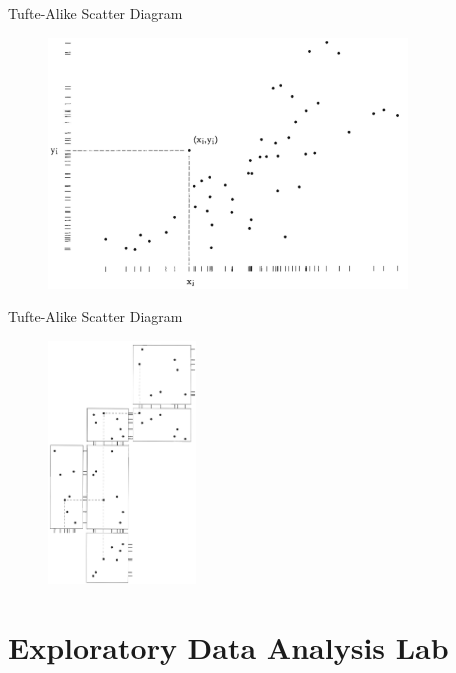 \documentclass[notes, aspectratio=1610]{beamer}
\begin{document}
\begin{frame}{Tufte-Alike Scatter Diagram}{}
\begin{figure}
		\begin{center}
			\includegraphics[width=0.85\textwidth]{images/tufte_scatter.png}
		\end{center}
	\end{figure}

\end{frame}

\begin{frame}{Tufte-Alike Scatter Diagram}{}
\begin{figure}
		\begin{center}
			\includegraphics[width=0.35\textwidth]{images/rug_plot.png}
		\end{center}
	\end{figure}
\end{frame}

\section{Exploratory Data Analysis Lab}
\end{document}
